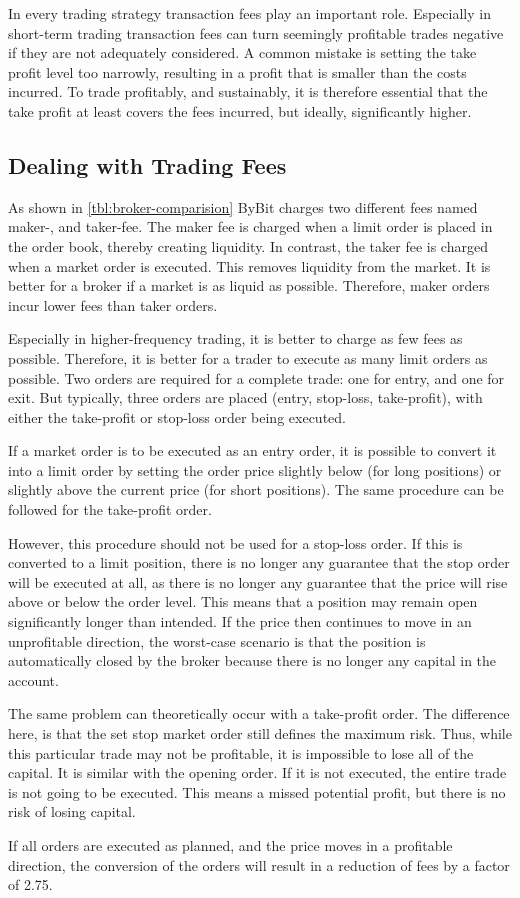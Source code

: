 In every trading strategy transaction fees play an important role.
Especially in short-term trading transaction fees can turn seemingly profitable trades negative if they are not adequately considered.
A common mistake is setting the take profit level too narrowly, resulting in a profit that is smaller than the costs incurred.
To trade profitably, and sustainably, it is therefore essential that the take profit at least covers the fees incurred, but ideally, significantly higher.

\subsection{Dealing with Trading Fees}
\label{chap:dealing-with-trading-fees}

As shown in \autoref{tbl:broker-comparision} ByBit charges two different fees named maker-, and taker-fee.
The maker fee is charged when a limit order is placed in the order book, thereby creating liquidity.
In contrast, the taker fee is charged when a market order is executed.
This removes liquidity from the market.
It is better for a broker if a market is as liquid as possible.
Therefore, maker orders incur lower fees than taker orders.

Especially in higher-frequency trading, it is better to charge as few fees as possible.
Therefore, it is better for a trader to execute as many limit orders as possible.
Two orders are required for a complete trade: one for entry, and one for exit.
But typically, three orders are placed (entry, stop-loss, take-profit), with either the take-profit or stop-loss order being executed.

If a market order is to be executed as an entry order, it is possible to convert it into a limit order by setting the order price slightly below (for long positions) or slightly above the current price (for short positions).
The same procedure can be followed for the take-profit order.

However, this procedure should not be used for a stop-loss order.
If this is converted to a limit position, there is no longer any guarantee that the stop order will be executed at all, as there is no longer any guarantee that the price will rise above or below the order level.
This means that a position may remain open significantly longer than intended.
If the price then continues to move in an unprofitable direction, the worst-case scenario is that the position is automatically closed by the broker because there is no longer any capital in the account.

The same problem can theoretically occur with a take-profit order.
The difference here, is that the set stop market order still defines the maximum risk.
Thus, while this particular trade may not be profitable, it is impossible to lose all of the capital.
It is similar with the opening order.
If it is not executed, the entire trade is not going to be executed.
This means a missed potential profit, but there is no risk of losing capital.

If all orders are executed as planned, and the price moves in a profitable direction, the conversion of the orders will result in a reduction of fees by a factor of 2.75.